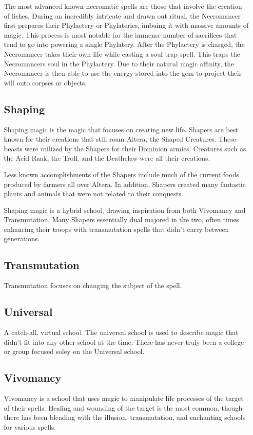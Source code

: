 \documentclass{article}
\begin{document}
The most advanced known necromatic spells are those that involve the creation of liches. During an incredibly intricate and drawn out ritual, the Necromancer first prepares their Phylactery or Phylateries, imbuing it with massive amounts of magic. This process is most notable for the immense number of sacrifices that tend to go into powering a single Phylatery. After the Phylactery is charged, the Necromancer takes their own life while casting a soul trap spell. This traps the Necromancers soul in the Phylactery. Due to their natural magic affinity, the Necromancer is then able to use the energy stored into the gem to project their will onto corpses or objects.

\subsection{Shaping}
Shaping magic is the magic that focuses on creating new life. Shapers are best known for their creations that still roam Altera, the Shaped Creatures. These beasts were utilized by the Shapers for their Dominion armies. Creatures such as the Acid Raak, the Troll, and the Deathclaw were all their creations.

Less known accomplishments of the Shapers include much of the current foods produced by farmers all over Altera. In addition, Shapers created many fantastic plants and animals that were not related to their conquests.

Shaping magic is a hybrid school, drawing inspiration from both Vivomancy and Transmutation. Many Shapers essentially dual majored in the two, often times enhancing their troops with transmutation spells that didn't carry between generations.

\subsection{Transmutation}
Transmutation focuses on changing the subject of the spell.

\subsection{Universal}
A catch-all, virtual school. The universal school is used to describe magic that didn't fit into any other school at the time. There has never truly been a college or group focused soley on the Universal school.

\subsection{Vivomancy}
Vivomancy is a school that uses magic to manipulate life processes of the target of their spells. Healing and wounding of the target is the most common, though there has been blending with the illusion, transmutation, and enchanting schools for various spells.
\end{document}
